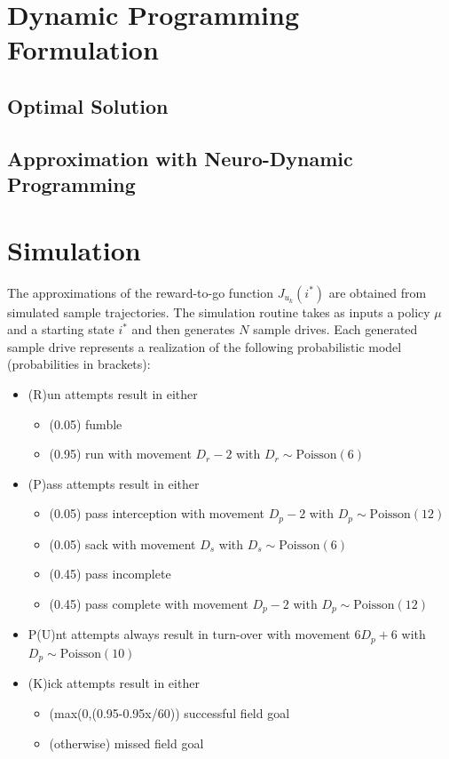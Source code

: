 \documentclass[11pt, oneside]{article}   	%
\begin{document}
\newpage
\section{Dynamic Programming Formulation}

\subsection{Optimal Solution}

\subsection{Approximation with Neuro-Dynamic Programming}

\section{Simulation}
The approximations of the reward-to-go function $J_{u_k}(i^*)$ are obtained from simulated sample trajectories. The simulation routine takes as inputs a policy $\mu$ and a starting state $i^*$ and then generates $N$ sample drives. Each generated sample drive represents a realization of the following probabilistic model (probabilities in brackets):
\begin{itemize}
\item (R)un attempts result in either
\begin{itemize}
\item (0.05) fumble
\item (0.95) run with movement $D_r -2$ with $D_r \sim \text{Poisson}(6)$
\end{itemize}
\item (P)ass attempts result in either
\begin{itemize}
\item (0.05) pass interception with movement $D_p -2$ with $D_p \sim \text{Poisson}(12)$
\item (0.05) sack with movement $D_s$ with $D_s \sim \text{Poisson}(6)$
\item (0.45) pass incomplete
\item (0.45) pass complete with movement $D_p -2$ with $D_p \sim \text{Poisson}(12)$
\end{itemize}
\item P(U)nt attempts always result in turn-over with movement $6 D_p + 6$ with $D_p \sim \text{Poisson}(10)$ 
\item (K)ick attempts result in either
\begin{itemize}
\item (max(0,(0.95-0.95x/60)) successful field goal
\item (otherwise) missed field goal
\end{itemize}
\end{itemize}
\end{document}
